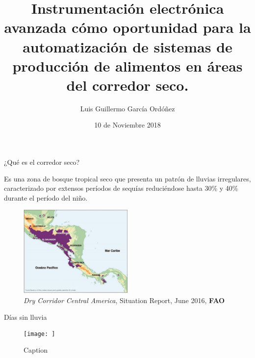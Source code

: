\documentclass[]{beamer}
\title{Instrumentación electrónica avanzada cómo oportunidad para la automatización de sistemas de producción de alimentos en áreas del corredor seco.}
\author{Luis Guillermo García Ordóñez}
\date{10 de Noviembre 2018}
\begin{document}
\maketitle

\begin{frame}{¿Qué es el corredor seco?}

Es una zona de bosque tropical seco que presenta un patrón de lluvias irregulares, caracterizado por extensos períodos de sequías reduciéndose hasta 30\% y 40\% durante el período del niño. 
\begin{figure}
    \centering
    \includegraphics[width=0.5\textwidth]{Docs/Mapa_CS}
    \caption{\small \textit{Dry Corridor Central America}, Situation Report, June 2016, \textbf{FAO}}
    \label{fig:my_label}
\end{figure}

\end{frame}

\begin{frame}{Días sin lluvia}
\begin{figure}
    \centering
    \texttt{[image: ]}
    \caption{Caption}
    \label{fig:my_label}
\end{figure}    
\end{frame}
\end{document}
